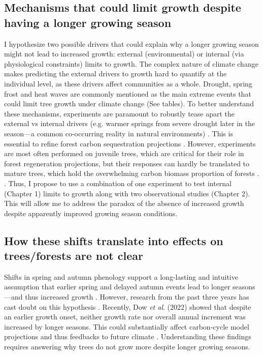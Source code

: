 \documentclass{article}
\begin{document}
\subsection{Mechanisms that could limit growth despite having a longer growing season}
I hypothesize two possible drivers that could explain why a longer growing season might not lead to increased growth: external (environmental) \cite{kolar_response_2016} or internal (via physiological constraints)\cite{zohner_effect_2023} limits to growth. The complex nature of climate change makes predicting the external drivers to growth hard to quantify at the individual level, as these drivers affect communities as a whole. Drought, spring frost and heat waves are commonly mentioned as the main extreme events that could limit tree growth under climate change \cite{tyree_xylem_2002, choat_triggers_2018, li_widespread_2023,trenberth_global_2014,intergovernmental_panel_on_climate_change_detection_2014,chiang_evidence_2021,polgar_leafout_2011,reinmann_compensatory_2023} (See tables). To better understand these mechanisms, experiments are paramount to robustly tease apart the external vs internal drivers (e.g. warmer springs from severe drought later in the season---a common co-occurring reality in natural environments) \cite{morin_changes_2010,primack_observations_2015}. This is essential to refine forest carbon sequestration projections \cite{green_limits_2022,cabon_cross-biome_2022}. However, experiments are most often performed on juvenile trees, which are critical for their role in forest regeneration projections, but their responses can hardly be translated to mature trees, which hold the overwhelming carbon biomass proportion of forests \cite{augspurger_differences_2003,silvestro_longer_2023,vitasse_ontogenic_2013}. \cite{berra_assessing_2019,piao_plant_2019,teng_bringing_2025}. Thus, I propose to use a combination of one experiment to test internal (Chapter 1) limits to growth along with two observational studies (Chapter 2). This will allow me to address the paradox of the absence of increased growth despite apparently improved growing season conditions. 

\subsection{How these shifts translate into effects on trees/forests are not clear}
Shifts in spring and autumn phenology support a long-lasting and intuitive assumption that earlier spring and delayed autumn events lead to longer seasons---and thus increased growth \cite{keenan_net_2014}. However, research from the past three years has cast doubt on this hypothesis \cite{dow_warm_2022,green_limits_2022,silvestro_longer_2023}. Recently, Dow \textit{et al}. (2022) showed that despite an earlier growth onset, neither growth rate nor overall annual increment was increased by longer seasons. This could substantially affect carbon-cycle model projections and thus feedbacks to future climate \cite{richardson_climate_2013,swidrak_comparing_2013}. 
Understanding these findings requires answering why trees do not grow more despite longer growing seasons. 
\end{document}

